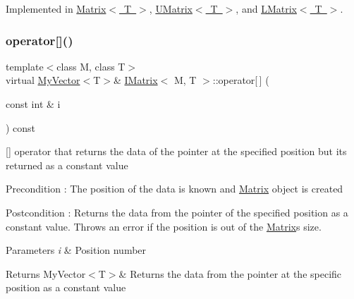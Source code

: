 Implemented in \mbox{\hyperlink{class_matrix_aa9532c87a69bef256954e2309ca3fdd6}{Matrix$<$ T $>$}}, \mbox{\hyperlink{class_u_matrix_a0dea1e82fbf5ae67bec479c070b185dc}{U\+Matrix$<$ T $>$}}, and \mbox{\hyperlink{class_l_matrix_a7eab2a6c57437448d21a04484844e359}{L\+Matrix$<$ T $>$}}.

\mbox{\label{class_i_matrix_a1ed62ee6700728045083c7f0df3e3e62}} 
\subsubsection{\texorpdfstring{operator[]()}{operator[]()}\hspace{0.1cm}{\footnotesize\ttfamily [2/2]}}
{\footnotesize\ttfamily template$<$class M, class T$>$ \\
virtual \mbox{\hyperlink{class_my_vector}{My\+Vector}}$<$T$>$\& \mbox{\hyperlink{class_i_matrix}{I\+Matrix}}$<$ M, T $>$\+::operator\mbox{[}$\,$\mbox{]} (\begin{DoxyParamCaption}\item[{const int \&}]{i }\end{DoxyParamCaption}) const\hspace{0.3cm}{\ttfamily [pure virtual]}}



\mbox{[}\mbox{]} operator that returns the data of the pointer at the specified position but its returned as a constant value 

\begin{DoxyPrecond}{Precondition}
\+: The position of the data is known and \mbox{\hyperlink{class_matrix}{Matrix}} object is created 
\end{DoxyPrecond}
\begin{DoxyPostcond}{Postcondition}
\+: Returns the data from the pointer of the specified position as a constant value. Throws an error if the position is out of the \mbox{\hyperlink{class_matrix}{Matrix}}\textquotesingle{}s size. 
\end{DoxyPostcond}

\begin{DoxyParams}{Parameters}
{\em i} & Position number \\
\hline
\end{DoxyParams}
\begin{DoxyReturn}{Returns}
My\+Vector$<$\+T$>$\& Returns the data from the pointer at the specific position as a constant value 
\end{DoxyReturn}


